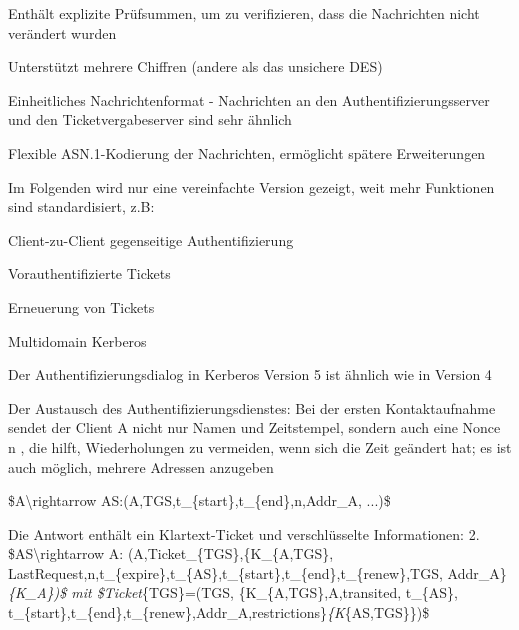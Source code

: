 \documentclass[a4paper]{article}
\begin{document}
\begin{multicols}{3}
\begin{itemize*}
            \begin{itemize*}
                  \item Enthält explizite Prüfsummen, um zu verifizieren, dass die Nachrichten nicht verändert wurden
                  \item Unterstützt mehrere Chiffren (andere als das unsichere DES)
            \end{itemize*}
            \item
            Einheitliches Nachrichtenformat - Nachrichten an den
            Authentifizierungsserver und den Ticketvergabeserver sind sehr ähnlich
            \item
            Flexible ASN.1-Kodierung der Nachrichten, ermöglicht spätere
            Erweiterungen
            \item
            Im Folgenden wird nur eine vereinfachte Version gezeigt, weit mehr
            Funktionen sind standardisiert, z.B:

            \begin{itemize*}
                  \item Client-zu-Client gegenseitige Authentifizierung
                  \item Vorauthentifizierte Tickets
                  \item Erneuerung von Tickets
                  \item Multidomain Kerberos
            \end{itemize*}
            \item
            Der Authentifizierungsdialog in Kerberos Version 5 ist ähnlich wie in
            Version 4
            \item
            Der Austausch des Authentifizierungsdienstes: Bei der ersten
            Kontaktaufnahme sendet der Client A nicht nur Namen und Zeitstempel,
            sondern auch eine Nonce n , die hilft, Wiederholungen zu vermeiden,
            wenn sich die Zeit geändert hat; es ist auch möglich, mehrere Adressen
            anzugeben

            \begin{enumerate*}
                  \def\labelenumi{\arabic{enumi}.}
                  \item \$A\textbackslash rightarrow AS:(A,TGS,t\_\{start\},t\_\{end\},n,Addr\_A, ...)\$
            \end{enumerate*}
            \item
            Die Antwort enthält ein Klartext-Ticket und verschlüsselte
            Informationen: 2. \$AS\textbackslash rightarrow A:
            (A,Ticket\_\{TGS\},\{K\_\{A,TGS\},
            LastRequest,n,t\_\{expire\},t\_\{AS\},t\_\{start\},t\_\{end\},t\_\{renew\},TGS,
            Addr\_A\}\emph{\{K\_A\})\$ mit \$Ticket}\{TGS\}=(TGS,
            \{K\_\{A,TGS\},A,transited, t\_\{AS\},
            t\_\{start\},t\_\{end\},t\_\{renew\},Addr\_A,restrictions\}\emph{\{K}\{AS,TGS\}\})\$


\end{itemize*}
\end{multicols}
\end{document}
